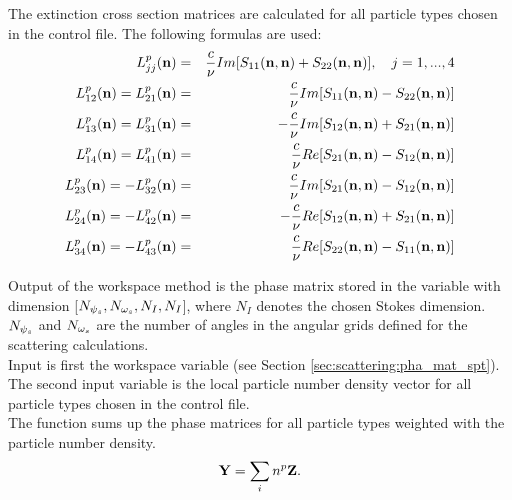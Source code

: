 The extinction cross section matrices \SExMat{} are
calculated for all particle types chosen in the control
file. The following formulas are used:
\begin{eqnarray}
  \label{eq:gen_ext_matrix}
  L^p_{jj}({\bf n}) &=& \frac{c}{\nu} Im[S_{11}({\bf n},{\bf
    n})+S_{22}({\bf n},{\bf n})], \quad j=1,...,4 \\
  L^p_{12}({\bf n}) = L^p_{21}({\bf n}) &=& \frac{c}{\nu} Im[S_{11}({\bf n},{\bf
    n})-S_{22}({\bf n},{\bf n})]\\
  L^p_{13}({\bf n}) = L^p_{31}({\bf n}) &=& -\frac{c}{\nu} Im[S_{12}({\bf n},{\bf
    n})+S_{21}({\bf n},{\bf n})]\\
  L^p_{14}({\bf n}) = L^p_{41}({\bf n}) &=& \frac{c}{\nu} Re[S_{21}({\bf n},{\bf
    n})-S_{12}({\bf n},{\bf n})]\\
  L^p_{23}({\bf n}) = -L^p_{32}({\bf n}) &=& \frac{c}{\nu} Im[S_{21}({\bf n},{\bf
    n})-S_{12}({\bf n},{\bf n})]\\
  L^p_{24}({\bf n}) = -L^p_{42}({\bf n}) &=& -\frac{c}{\nu} Re[S_{12}({\bf n},{\bf
    n})+S_{21}({\bf n},{\bf n})]\\
  L^p_{34}({\bf n}) = -L^p_{43}({\bf n}) &=& \frac{c}{\nu} Re[S_{22}({\bf n},{\bf
    n})-S_{11}({\bf n},{\bf n})]
\end{eqnarray}


\label{sec:scattering:tot_pha_mat}

\label{sec:scattering:pha_mat}

Output of the workspace method  is the phase
matrix stored in the variable   with dimension
[$N_{{\psi_s}}, N_{{\omega_s}}, N_{I}, N_{I}$], where $N_{I}$ denotes the
chosen Stokes dimension.  $N_{{\psi_s}}$ and 
$N_{{\omega_s}}$ are the number of angles in the angular grids defined for
the scattering calculations.\\
Input is first the workspace variable  (see Section
\ref{sec:scattering:pha_mat_spt}). The second input variable is the
local particle number density vector  for all
particle types chosen in the control file.\\
The function sums up the phase matrices for all particle types
weighted with the particle number density.
\begin{eqnarray}
{\bf Y} = \sum_i{n^p{\bf Z}}.
\end{eqnarray}

